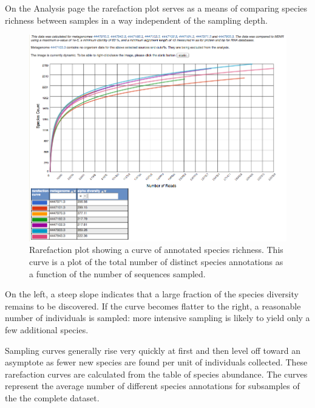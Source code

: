 \documentclass[12pt,fullpage]{report}
\begin{document}
On the Analysis page the rarefaction plot serves as a means of comparing species richness between samples in a way independent of the sampling depth.

\begin{figure}
\begin{center}
\includegraphics[width=6in]{Images/analysis-page-rarefaction-example.png}
\end{center}
\caption{
Rarefaction plot showing a curve of annotated species richness. This curve is a plot of the total number of distinct species annotations as a function of the number of sequences sampled.
}
\label{fig:analysis-page-rarefaction-example}
\end{figure}

On the left, a steep slope indicates that a large fraction of the species diversity remains to be discovered. If the curve becomes flatter to the right, a reasonable number of individuals is sampled: more intensive sampling is likely to yield only a few additional species.

Sampling curves generally rise very quickly at first and then level off toward an asymptote as fewer new species are found per unit of individuals collected. These rarefaction curves are calculated from the table of species abundance. The curves represent the average number of different species annotations for subsamples of the the complete dataset.


\end{document}

